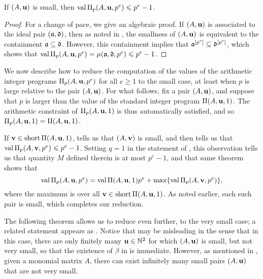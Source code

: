 \documentclass{amsart}
\begin{document}
\begin{proposition}
   \label{trivial small value bound: P}
   If $(A, \mathbf{u})$ is small,  then $\operatorname{val} \Pi_p(A, \mathbf{u}, p^e) \leqslant p^e-1$.
\end{proposition}

\begin{proof}
   For a change of pace, we give an algebraic proof.
   If $(A,\mathbf{u})$ is associated to the ideal pair $(\mathfrak{a}, \mathfrak{d})$, then as noted in , the smallness of $(A, \mathbf{u})$ is equivalent to the containment $\mathfrak{a} \subseteq \mathfrak{d}$.
   However, this containment implies that $\mathfrak{a}^{[p^e]} \subseteq \mathfrak{d}^{[p^e]}$, which shows that $\operatorname{val} \Pi_p(A, \mathbf{u}, p^e) = \mu(\mathfrak{a}, \mathfrak{d}, p^e) \leqslant p^e-1$.
\end{proof}

\begin{remark}
   We now describe how to reduce the computation of the values of the arithmetic integer programs $\Pi_p(A, \mathbf{u}, p^e)$ for all $e \geq 1$ to the small case, at least when $p$ is large relative to the pair $(A, \mathbf{u})$.
   For what follows, fix a pair $(A, \mathbf{u})$, and suppose that $p$ is larger than the value of the standard integer program $\Pi(A, \mathbf{u},1)$.
   The arithmetic constraint of $\Pi_p(A,\mathbf{u},1)$ is thus automatically satisfied, and so $\Pi_p(A, \mathbf{u}, 1) = \Pi(A, \mathbf{u}, 1)$.

   If $\mathbf{v} \in \operatorname{short} \Pi(A,\mathbf{u},1)$,  tells us that $(A, \mathbf{v})$ is small, and   then tells us that $\operatorname{val} \Pi_p(A, \mathbf{v}, p^e) \leqslant p^e-1$.
   Setting $q=1$ in the statement of , this observation tells us that quantity $M$ defined therein is at most $p^e-1$, and that same theorem shows that
   \[ \operatorname{val} \Pi_p(A, \mathbf{u},p^e) = \operatorname{val} \Pi(A, \mathbf{u},1)p^e + \max \{ \operatorname{val} \Pi_p(A, \mathbf{v}, p^e) \},\]
   where the maximum is over all $\mathbf{v} \in \operatorname{short} \Pi(A, \mathbf{u},1)$.
   As noted earlier, each such pair is small, which completes our reduction.
\end{remark}

The following theorem allows us to reduce even further, to the very small case; a related statement appears as \cite[Theorem~6.4]{hernandez+etal.frobenius_powers}.
Notice that  may be misleading in the sense that in this case, there are only finitely many $\mathbf{u} \in \mathbb{N}^2$ for which $(A, \mathbf{u})$ is small, but not very small, so that the existence of $\beta$ in  is immediate.
However, as mentioned in , given a monomial matrix $A$, there can exist infinitely many small pairs $(A, \mathbf{u})$ that are not very small.
\end{document}
